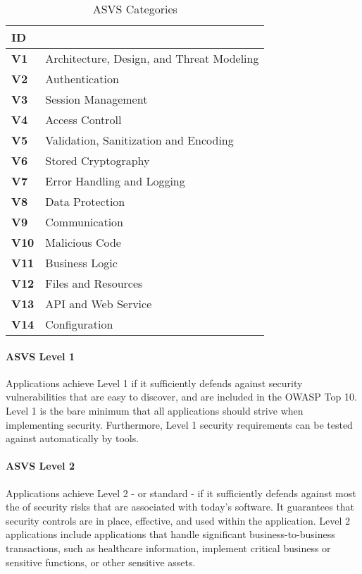 \begin{table}
    \centering
    \caption{ASVS Categories}
    \label{tab:asvs-categories}
    \begin{tabulary}{1.0\textwidth}{|l|L|}
        \hline
        \textbf{ID} &  \\                                                    
        \hline
        \textbf{V1} & Architecture, Design, and Threat Modeling \\
        \hline
        \textbf{V2} & Authentication \\
        \hline
        \textbf{V3} & Session Management \\
        \hline
        \textbf{V4} & Access Controll \\
        \hline
        \textbf{V5} & Validation, Sanitization and Encoding \\
        \hline
        \textbf{V6} & Stored Cryptography \\
        \hline
        \textbf{V7} & Error Handling and Logging \\
        \hline
        \textbf{V8} & Data Protection \\
        \hline
        \textbf{V9} & Communication \\
        \hline
        \textbf{V10} & Malicious Code \\
        \hline
        \textbf{V11} & Business Logic \\
        \hline
        \textbf{V12} & Files and Resources \\
        \hline
        \textbf{V13} & API and Web Service \\
        \hline
        \textbf{V14} & Configuration \\
        \hline
    \end{tabulary}
\end{table}


\paragraph{ASVS Level 1}
Applications achieve Level 1 if it sufficiently defends against security vulnerabilities that are easy to discover, and are included in the OWASP Top 10. Level 1 is the bare minimum that all applications should strive when implementing security. Furthermore, Level 1 security requirements can be tested against automatically by tools.

\paragraph{ASVS Level 2}
Applications achieve Level 2 - or standard - if it sufficiently defends against most the of security risks that are associated with today's software. It guarantees that security controls are in place, effective, and used within the application. Level 2 applications include applications that handle significant business-to-business transactions, such as healthcare information, implement critical business or sensitive functions, or other sensitive assets.

